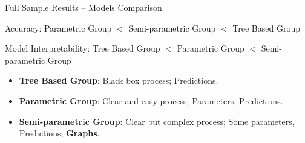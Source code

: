 \documentclass{beamer}
\begin{document}
\begin{frame}[t]{Full Sample Results -- Models Comparison}

\begin{block}{Accuracy:}
\vspace{0.5em}
Parametric Group $<$ Semi-parametric Group $<$ Tree Based Group 
\end{block}

\begin{block}{Model Interpretability:}
\vspace{0.5em}
Tree Based Group $<$ Parametric Group $<$ Semi-parametric Group\\
\vspace{0.5em}
\begin{itemize}
\item \textbf{Tree Based Group}: Black box process; Predictions.\\

\item \textbf{Parametric Group}: Clear and easy process; Parameters, Predictions.\\

\item \textbf{Semi-parametric Group}: Clear but complex process; Some parameters, Predictions, \textbf{Graphs}. 
\end{itemize}
\end{block}
\end{frame}
\end{document}
